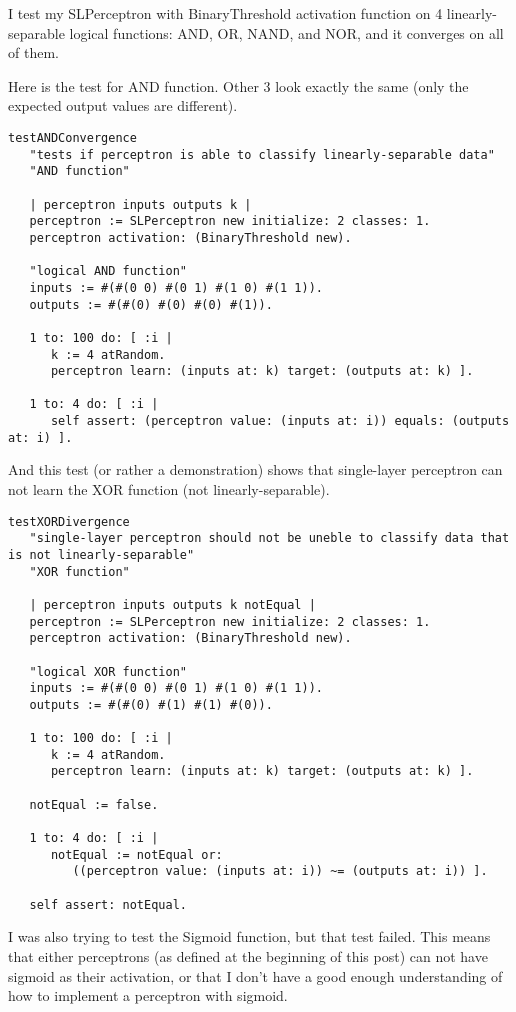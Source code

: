 I test my SLPerceptron with BinaryThreshold activation function on 4 linearly-separable logical functions: AND, OR, NAND, and NOR, and it converges on all of them.

Here is the test for AND function. Other 3 look exactly the same (only the expected output values are different).

\begin{lstlisting}
testANDConvergence
   "tests if perceptron is able to classify linearly-separable data"
   "AND function"

   | perceptron inputs outputs k |
   perceptron := SLPerceptron new initialize: 2 classes: 1.
   perceptron activation: (BinaryThreshold new).
 
   "logical AND function"
   inputs := #(#(0 0) #(0 1) #(1 0) #(1 1)).
   outputs := #(#(0) #(0) #(0) #(1)).
 
   1 to: 100 do: [ :i |
      k := 4 atRandom.
      perceptron learn: (inputs at: k) target: (outputs at: k) ].
 
   1 to: 4 do: [ :i |
      self assert: (perceptron value: (inputs at: i)) equals: (outputs at: i) ].
\end{lstlisting}

And this test (or rather a demonstration) shows that single-layer perceptron can not learn the XOR function (not linearly-separable).

\begin{lstlisting}
testXORDivergence
   "single-layer perceptron should not be uneble to classify data that is not linearly-separable"
   "XOR function"
   
   | perceptron inputs outputs k notEqual |
   perceptron := SLPerceptron new initialize: 2 classes: 1.
   perceptron activation: (BinaryThreshold new).
 
   "logical XOR function"
   inputs := #(#(0 0) #(0 1) #(1 0) #(1 1)).
   outputs := #(#(0) #(1) #(1) #(0)).
 
   1 to: 100 do: [ :i |
      k := 4 atRandom.
      perceptron learn: (inputs at: k) target: (outputs at: k) ].
 
   notEqual := false.
 
   1 to: 4 do: [ :i |
      notEqual := notEqual or:
         ((perceptron value: (inputs at: i)) ~= (outputs at: i)) ].
  
   self assert: notEqual.
\end{lstlisting}

I was also trying to test the Sigmoid function, but that test failed. This means that either perceptrons (as defined at the beginning of this post) can not have sigmoid as their activation, or that I don’t have a good enough understanding of how to implement a perceptron with sigmoid.
